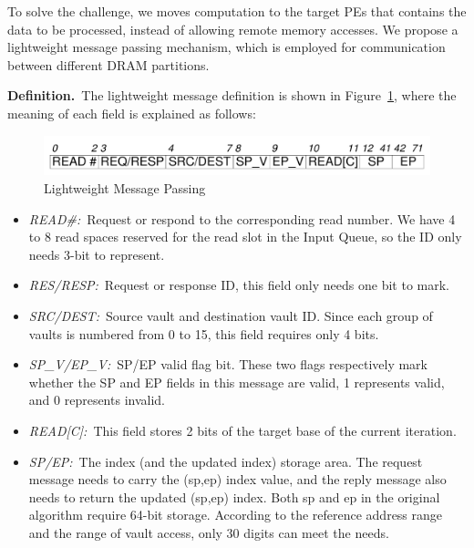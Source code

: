 \documentclass[9pt,conference]{IEEEtran}
\begin{document}
To solve the challenge, we moves computation to the target PEs that contains the data to be processed, instead of allowing remote memory accesses. We propose a lightweight message passing mechanism, which is employed for communication between different DRAM partitions.

\textbf{Definition.}~The lightweight message definition is shown in Figure~\ref{fig:message}, where the meaning of each field is explained as follows:

\begin{figure}[htbp]
    \centering
    \includegraphics[width=\linewidth]{fig/Bits.pdf}
    \caption{Lightweight Message Passing}
    \label{fig:message}
\end{figure}


\begin{itemize}
    \item \textit{READ\#:}~Request or respond to the corresponding read number. We have 4 to 8 read spaces reserved for the read slot in the Input Queue, so the ID only needs 3-bit to represent.
    
    \item \textit{RES/RESP:}~Request or response ID, this field only needs one bit to mark.
    
    \item \textit{SRC/DEST:}~Source vault and destination vault ID. Since each group of vaults is numbered from 0 to 15, this field requires only 4 bits.
    
    \item \textit{SP\_V/EP\_V:}~SP/EP valid flag bit. These two flags respectively mark whether the SP and EP fields in this message are valid, 1 represents valid, and 0 represents invalid.
    
    \item \textit{READ[C]:}~This field stores 2 bits of the target base of the current iteration.
    
    \item \textit{SP/EP:}~The index (and the updated index) storage area. The request message needs to carry the (sp,ep) index value, and the reply message also needs to return the updated (sp,ep) index. Both sp and ep in the original algorithm require 64-bit storage. According to the reference address range and the range of vault access, only 30 digits can meet the needs.
\end{itemize}
\end{document}

